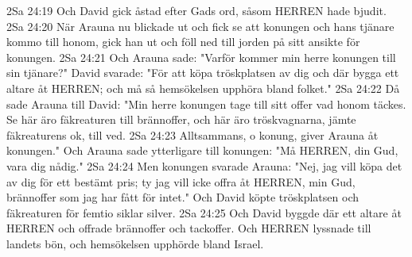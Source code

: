 2Sa 24:19  Och David gick åstad efter Gads ord, såsom HERREN hade bjudit.
2Sa 24:20  När Arauna nu blickade ut och fick se att konungen och hans tjänare kommo till honom, gick han ut och föll ned till jorden på sitt ansikte för konungen.
2Sa 24:21  Och Arauna sade: "Varför kommer min herre konungen till sin tjänare?" David svarade: "För att köpa tröskplatsen av dig och där bygga ett altare åt HERREN; och må så hemsökelsen upphöra bland folket."
2Sa 24:22  Då sade Arauna till David: "Min herre konungen tage till sitt offer vad honom täckes. Se här äro fäkreaturen till brännoffer, och här äro tröskvagnarna, jämte fäkreaturens ok, till ved.
2Sa 24:23  Alltsammans, o konung, giver Arauna åt konungen." Och Arauna sade ytterligare till konungen: "Må HERREN, din Gud, vara dig nådig."
2Sa 24:24  Men konungen svarade Arauna: "Nej, jag vill köpa det av dig för ett bestämt pris; ty jag vill icke offra åt HERREN, min Gud, brännoffer som jag har fått för intet." Och David köpte tröskplatsen och fäkreaturen för femtio siklar silver.
2Sa 24:25  Och David byggde där ett altare åt HERREN och offrade brännoffer och tackoffer. Och HERREN lyssnade till landets bön, och hemsökelsen upphörde bland Israel.


